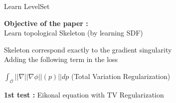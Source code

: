 \begin{frame}{Learn LevelSet }
	\begin{minipage}{0.78\linewidth}
		\vspace{5pt}
		\textbf{Objective of the paper :} \\
		Learn topological Skeleton (by learning SDF) \quad {}
	\end{minipage} \begin{minipage}{0.18\linewidth}	
		\vspace{-30pt}
		\hspace{70pt}
	\end{minipage}
	
	 Skeleton correspond exactly to the gradient singularity \\
	 Adding the following term in the loss \\
	\begin{minipage}{0.38\linewidth}
		\centering
		$\int_\mathcal{O} ||\nabla||\nabla\phi||(p)||dp$
		\flushright
		(Total Variation Regularization)
	\end{minipage} \quad \begin{minipage}{0.58\linewidth}	
		\vspace{-10pt}
		\flushright
	\end{minipage}

	\vspace{8pt}

%	

	\begin{minipage}{0.65\linewidth}
		\textbf{1st test :} Eikonal equation with TV Regularization \cite{clemot_neural_2023}
		
		\vspace{25pt}
	\end{minipage} \begin{minipage}{0.32\linewidth}	
	\vspace{-55pt}
	\end{minipage}
\end{frame}

